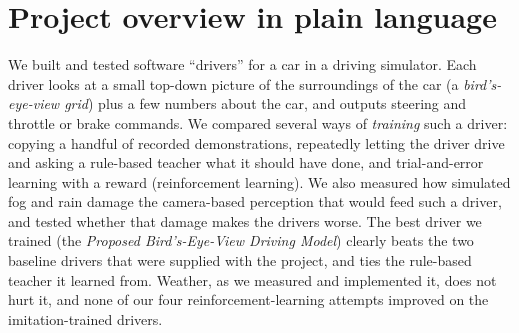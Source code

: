 \section{Project overview in plain language}\label{sec:overview}

\begin{plainwords}
We built and tested software ``drivers'' for a car in a driving simulator. Each driver looks at a small top-down picture of the surroundings of the car (a \emph{bird's-eye-view grid}) plus a few numbers about the car, and outputs steering and throttle or brake commands.
We compared several ways of \emph{training} such a driver: copying a handful of recorded demonstrations, repeatedly letting the driver drive and asking a rule-based teacher what it should have done, and trial-and-error learning with a reward (reinforcement learning).
We also measured how simulated fog and rain damage the camera-based perception that would feed such a driver, and tested whether that damage makes the drivers worse.
The best driver we trained (the \emph{Proposed Bird's-Eye-View Driving Model}) clearly beats the two baseline drivers that were supplied with the project, and ties the rule-based teacher it learned from. Weather, as we measured and implemented it, does not hurt it, and none of our four reinforcement-learning attempts improved on the imitation-trained drivers.
\end{plainwords}

